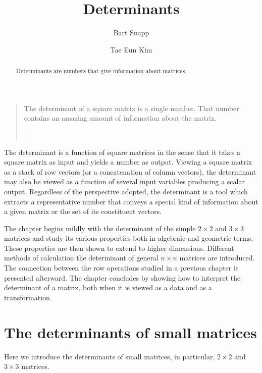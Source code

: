 \documentclass{ximera}
\author{Bart Snapp \and Tae Eun Kim}
\title{Determinants}
\begin{document}
\begin{abstract}
  Determinants are numbers that give information about matrices.
\end{abstract}
\maketitle



\begin{quote}
  The determinant of a square matrix is a single number. That number
  contains an amazing amount of information about the matrix.

  \hfill ---
\end{quote}

The determinant is a function of square matrices in the sense that it
takes a square matrix as input and yields a number as output. Viewing
a square matrix as a stack of row vectors (or a concatenation of
column vectors), the determinant may also be viewed as a function of
several input variables producing a scalar output. Regardless of the
perspective adopted, the determinant is a tool which extracts a
representative number that conveys a special kind of information about a
given matrix or the set of its constituent vectors.

The chapter begins mildly with the determinant of the simple
$2 \times 2$ and $3 \times 3$ matrices and study its various properties both in
algebraic and geometric terms. These properties are then shown to
extend to higher dimensions. Different methods of calculation the
determinant of general $n \times n$ matrices are introduced. The connection
between the row operations studied in a previous chapter is presented
afterward. The chapter concludes by showing how to interpret the
determinant of a matrix, both when it is viewed as a data and as a
transformation.

\section{The determinants of small matrices}
Here we introduce the determinants of small matrices, in particular, $2 \times 2$ and $3 \times 3$ matrices.
\end{document}
